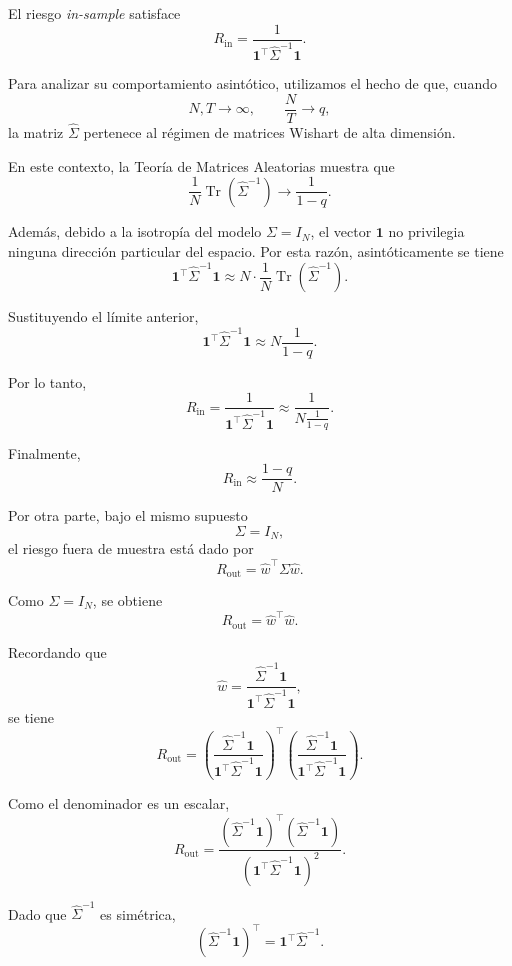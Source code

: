\documentclass[letterpaper,12pt,oneside]{book}
\begin{document}
El riesgo \textit{in-sample} satisface
\[
R_{\mathrm{in}}
=
\frac{
1
}{
\mathbf{1}^\top
\widehat{\Sigma}^{-1}
\mathbf{1}
}.
\]

Para analizar su comportamiento asintótico, utilizamos el hecho de que, cuando
\[
N,T\to\infty,
\qquad
\frac{N}{T}\to q,
\]
la matriz \(\widehat{\Sigma}\) pertenece al régimen de matrices Wishart de alta dimensión.

En este contexto, la Teoría de Matrices Aleatorias muestra que
\[
\frac{1}{N}
\operatorname{Tr}
\left(
\widehat{\Sigma}^{-1}
\right)
\longrightarrow
\frac{1}{1-q}.
\]

Además, debido a la isotropía del modelo \(\Sigma=I_N\), el vector \(\mathbf{1}\) no privilegia ninguna dirección particular del espacio. Por esta razón, asintóticamente se tiene
\[
\mathbf{1}^\top
\widehat{\Sigma}^{-1}
\mathbf{1}
\approx
N
\cdot
\frac{1}{N}
\operatorname{Tr}
(\widehat{\Sigma}^{-1}).
\]

Sustituyendo el límite anterior,
\[
\mathbf{1}^\top
\widehat{\Sigma}^{-1}
\mathbf{1}
\approx
N\frac{1}{1-q}.
\]

Por lo tanto,
\[
R_{\mathrm{in}}
=
\frac{
1
}{
\mathbf{1}^\top
\widehat{\Sigma}^{-1}
\mathbf{1}
}
\approx
\frac{
1
}{
N\frac{1}{1-q}
}.
\]

Finalmente,
\[
R_{\mathrm{in}}
\approx
\frac{1-q}{N}.
\]

Por otra parte, bajo el mismo supuesto
\[
\Sigma=I_N,
\]
el riesgo fuera de muestra está dado por
\[
R_{\mathrm{out}}
=
\widehat{w}^{\top}
\Sigma
\widehat{w}.
\]

Como \(\Sigma=I_N\), se obtiene
\[
R_{\mathrm{out}}
=
\widehat{w}^{\top}
\widehat{w}.
\]

Recordando que
\[
\widehat{w}
=
\frac{
\widehat{\Sigma}^{-1}\mathbf{1}
}{
\mathbf{1}^{\top}
\widehat{\Sigma}^{-1}
\mathbf{1}
},
\]
se tiene
\[
R_{\mathrm{out}}
=
\left(
\frac{
\widehat{\Sigma}^{-1}\mathbf{1}
}{
\mathbf{1}^{\top}
\widehat{\Sigma}^{-1}
\mathbf{1}
}
\right)^\top
\left(
\frac{
\widehat{\Sigma}^{-1}\mathbf{1}
}{
\mathbf{1}^{\top}
\widehat{\Sigma}^{-1}
\mathbf{1}
}
\right).
\]

Como el denominador es un escalar,
\[
R_{\mathrm{out}}
=
\frac{
(\widehat{\Sigma}^{-1}\mathbf{1})^\top
(\widehat{\Sigma}^{-1}\mathbf{1})
}{
\left(
\mathbf{1}^{\top}
\widehat{\Sigma}^{-1}
\mathbf{1}
\right)^2
}.
\]

Dado que \(\widehat{\Sigma}^{-1}\) es simétrica,
\[
(\widehat{\Sigma}^{-1}\mathbf{1})^\top
=
\mathbf{1}^{\top}
\widehat{\Sigma}^{-1}.
\]
\end{document}

